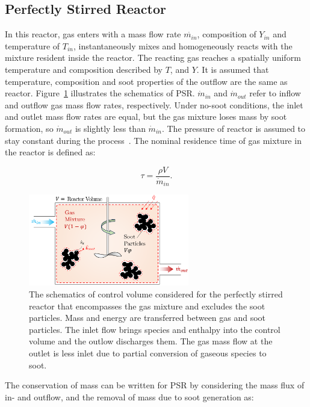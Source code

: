 \subsection{Perfectly Stirred Reactor}
In this reactor, gas enters with a mass flow rate $\dot{m_{in}}$, composition of $Y_{in}$ and temperature of $T_{in}$, instantaneously mixes and homogeneously reacts with the mixture resident inside the reactor. The reacting gas reaches a spatially uniform temperature and composition described by $T$, and $Y$. It is assumed that temperature, composition and soot properties of the outflow are the same as reactor. Figure~\ref{fig:psrcv} illustrates the schematics of PSR. ${\dot{m}_{in}}$ and ${\dot{m}_{out}}$ refer to inflow and outflow gas mass flow rates, respectively. Under no-soot conditions, the inlet and outlet mass flow rates are equal, but the gas mixture loses mass by soot formation, so ${\dot{m}_{out}}$ is slightly less than ${\dot{m}_{in}}$. The pressure of reactor is assumed to stay constant during the process~\citep{kee2017chemically}. The nominal residence time of gas mixture in the reactor is defined as:

\begin{equation}
	\tau = \frac{\rho V}{\dot{m}_{in}}
	\label{eqn:taupsr}.
\end{equation} 

 

\begin{figure}[!htbp]
	\centering
	\includegraphics[height=40mm, ]{Figures/Theory/PSR.pdf}
	\caption{The schematics of control volume considered for the perfectly stirred reactor that encompasses the gas mixture and excludes the soot particles. Mass and energy are transferred between gas and soot particles. The inlet flow brings species and enthalpy into the control volume and the outlow discharges them. The gas mass flow at the outlet is less inlet due to partial conversion of gaseous species to soot.}
	\label{fig:psrcv}
\end{figure}

The conservation of mass can be written for PSR by considering the mass flux of in- and outflow, and the removal of mass due to soot generation as:

